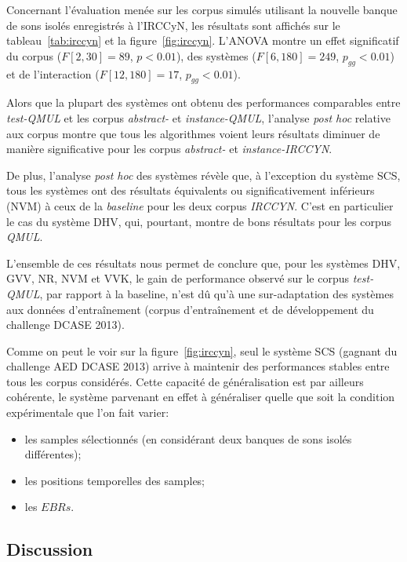 Concernant l'évaluation menée sur les corpus simulés utilisant la nouvelle banque de sons isolés enregistrés à l'IRCCyN, les résultats sont affichés sur le tableau~\ref{tab:irccyn} et la figure~\ref{fig:irccyn}. L'ANOVA montre un effet significatif du corpus ($F[2,30]=89$, $p<0.01$), des systèmes ($F[6,180]=249$, $p_{gg}<0.01$) et de l'interaction ($F[12,180]=17$, $p_{gg}<0.01$).

Alors que la plupart des systèmes ont obtenu des performances comparables entre \emph{test-QMUL} et les corpus \emph{abstract-} et \emph{instance-QMUL}, l'analyse \emph{post hoc} relative aux corpus montre que tous les algorithmes voient leurs résultats diminuer de manière significative pour les corpus  \emph{abstract-} et \emph{instance-IRCCYN}.

De plus, l'analyse \emph{post hoc} des systèmes révèle que, à l'exception du système SCS, tous les systèmes ont des résultats équivalents ou significativement inférieurs (NVM) à ceux de la \emph{baseline} pour les deux corpus \emph{IRCCYN}. C'est en particulier le cas du système DHV, qui, pourtant, montre de bons résultats pour les corpus \emph{QMUL}.

L'ensemble de ces résultats nous permet de conclure que, pour les systèmes DHV, GVV, NR, NVM et VVK, le gain de performance observé sur le corpus \emph{test-QMUL}, par rapport à la baseline, n'est dû qu'à une sur-adaptation des systèmes aux données d'entraînement (corpus d'entraînement et de développement du challenge DCASE 2013). 

Comme on peut le voir sur la figure~\ref{fig:irccyn}, seul le système SCS (gagnant du challenge AED DCASE 2013) arrive à maintenir des performances stables entre tous les corpus considérés. Cette capacité de généralisation est par ailleurs cohérente, le système parvenant en effet à généraliser quelle que soit la condition expérimentale que l'on fait varier: 

\begin{itemize}
\item les samples sélectionnés (en considérant deux banques de sons isolés différentes);
\item les positions temporelles des samples;
\item les $EBRs$.
\end{itemize}

\subsection{Discussion}

